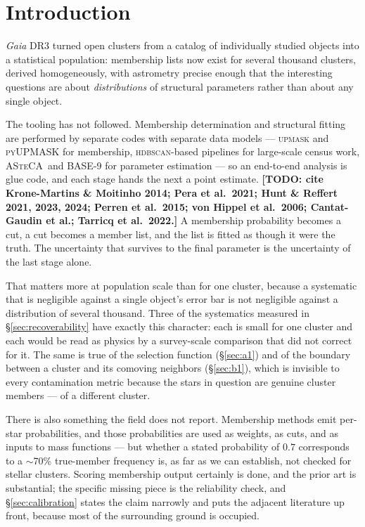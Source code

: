 \documentclass{aa}
\newcommand{\TODO}[1]{\textbf{[TODO: #1]}}
\newcommand{\asteca}{\textsc{ASteCA}}
\begin{document}
\section{Introduction}
\label{sec:intro}

\emph{Gaia} DR3 turned open clusters from a catalog of individually studied objects into a
statistical population: membership lists now exist for several thousand clusters, derived
homogeneously, with astrometry precise enough that the interesting questions are about
\emph{distributions} of structural parameters rather than about any single object.

The tooling has not followed. Membership determination and structural fitting are performed by
separate codes with separate data models --- \textsc{upmask} and \textsc{pyUPMASK} for membership,
\textsc{hdbscan}-based pipelines for large-scale census work, \asteca\ and \textsc{BASE-9} for
parameter estimation --- so an end-to-end analysis is glue code, and each stage hands the next a
point estimate. \TODO{cite Krone-Martins \& Moitinho 2014; Pera et al.\ 2021; Hunt \& Reffert
2021, 2023, 2024; Perren et al.\ 2015; von Hippel et al.\ 2006; Cantat-Gaudin et al.; Tarricq et
al.\ 2022.} A membership probability becomes a cut, a cut becomes a member list, and the list is
fitted as though it were the truth. The uncertainty that survives to the final parameter is the
uncertainty of the last stage alone.

That matters more at population scale than for one cluster, because a systematic that is
negligible against a single object's error bar is not negligible against a distribution of several
thousand. Three of the systematics measured in \S\ref{sec:recoverability} have exactly this
character: each is small for one cluster and each would be read as physics by a survey-scale
comparison that did not correct for it. The same is true of the selection function
(\S\ref{sec:a1}) and of the boundary between a cluster and its comoving neighbors
(\S\ref{sec:b1}), which is invisible to every contamination metric because the stars in question
are genuine cluster members --- of a different cluster.

There is also something the field does not report. Membership methods emit per-star
probabilities, and those probabilities are used as weights, as cuts, and as inputs to mass
functions --- but whether a stated probability of $0.7$ corresponds to a $\sim$70\% true-member
frequency is, as far as we can establish, not checked for stellar clusters. Scoring membership
output certainly is done, and the prior art is substantial; the specific missing piece is the
reliability check, and \S\ref{sec:calibration} states the claim narrowly and puts the adjacent
literature up front, because most of the surrounding ground is occupied.
\end{document}
